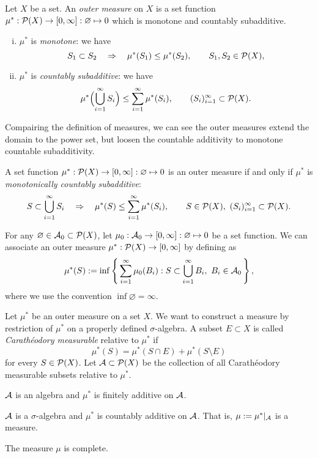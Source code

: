 \documentclass{../../large}
\begin{document}
\begin{prb}
Let $X$ be a set.
An \emph{outer measure} on $X$ is a set function $\mu^*:\mathcal{P}(X)\to[0,\infty]:\varnothing\mapsto0$ which is monotone and countably subadditive.
\begin{enumerate}[(i)]
\item $\mu^*$ is \emph{monotone}: we have
\[S_1\subset S_2\quad\Rightarrow\quad\mu^*(S_1)\le\mu^*(S_2),\qquad S_1,S_2\in\mathcal{P}(X),\]
\item $\mu^*$ is \emph{countably subadditive}: we have
\[\mu^*\Bigl(\bigcup_{i=1}^\infty S_i\Bigr)\le\sum_{i=1}^\infty\mu^*(S_i),\qquad (S_i)_{i=1}^\infty\subset\mathcal{P}(X).\]
\end{enumerate}
Compairing the definition of measures, we can see the outer measures extend the domain to the power set, but loosen the countable additivity to monotone countable subadditivity.
\begin{parts}
\item A set function $\mu^*:\mathcal{P}(X)\to[0,\infty]:\varnothing\mapsto0$ is an outer measure if and only if $\mu^*$ is \emph{monotonically countably subadditive}:
\[S\subset\bigcup_{i=1}^\infty S_i\quad\Rightarrow\quad\mu^*(S)\le\sum_{i=1}^\infty\mu^*(S_i),\qquad S\in\mathcal{P}(X),\ (S_i)_{i=1}^\infty\subset\mathcal{P}(X).\]
\item
For any $\varnothing\in\mathcal{A}_0\subset\mathcal{P}(X)$, let $\mu_0:\mathcal{A}_0\to[0,\infty]:\varnothing\mapsto0$ be a set function.
We can associate an outer measure $\mu^*:\mathcal{P}(X)\to[0,\infty]$ by defining as
\[\mu^*(S):=\inf\left\{\,\sum_{i=1}^\infty\mu_0(B_i):S\subset\bigcup_{i=1}^\infty B_i,\ B_i\in\mathcal{A}_0\,\right\},\]
where we use the convention $\inf\varnothing=\infty$.
\end{parts}
\end{prb}
\begin{pf}
\end{pf}


\begin{prb}
Let $\mu^*$ be an outer measure on a set $X$.
We want to construct a measure by restriction of $\mu^*$ on a properly defined $\sigma$-algebra.
A subset $E\subset X$ is called \emph{Carath\'eodory measurable} relative to $\mu^*$ if
\[\mu^*(S)=\mu^*(S\cap E)+\mu^*(S\setminus E)\]
for every $S\in\mathcal{P}(X)$.
Let $\mathcal{A}\subset\mathcal{P}(X)$ be the collection of all Carath\'eodory measurable subsets relative to $\mu^*$.
\begin{parts}
\item $\mathcal{A}$ is an algebra and $\mu^*$ is finitely additive on $\mathcal{A}$.
\item $\mathcal{A}$ is a $\sigma$-algebra and $\mu^*$ is countably additive on $\mathcal{A}$. That is, $\mu:=\mu^*|_{\mathcal{A}}$ is a measure.
\item The measure $\mu$ is complete.
\end{parts}
\end{prb}
\begin{pf}
\end{pf}
\end{document}
